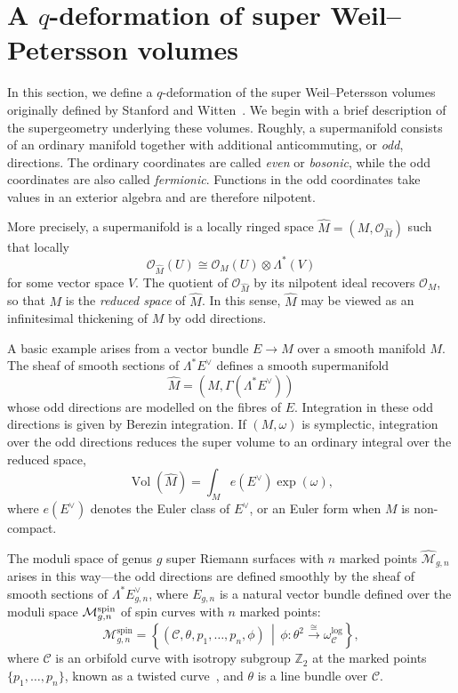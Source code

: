 \documentclass[a4paper]{article}
\theoremstyle{plain}
\theoremstyle{definition}
\newcommand{\modm}{\mathcal{M}}
\newcommand{\bz}{\mathbb{Z}}
\newcommand{\cc}{\mathcal{C}}
\newcommand{\co}{\mathcal{O}}
\begin{document}
\section{A \texorpdfstring{$q$}{q}-deformation of super Weil--Petersson volumes} \label{sec3}
In this section, we define a $q$-deformation of the super Weil--Petersson
volumes originally defined by Stanford and Witten~\cite{SWiJTG}.  We begin
with a brief description of the supergeometry underlying these volumes.
Roughly, a supermanifold consists of an ordinary manifold together with
additional anticommuting, or \emph{odd}, directions.  The ordinary coordinates
are called \emph{even} or \emph{bosonic}, while the odd coordinates are also
called \emph{fermionic}.  Functions in the odd coordinates take values in an
exterior algebra and are therefore nilpotent.

More precisely, a supermanifold is a locally ringed space
$\widehat{M}=(M,\co_{\widehat{M}})$ such that locally
\[
\co_{\widehat{M}}(U)
\cong
\co_M(U)\otimes\Lambda^*(V)
\]
for some vector space $V$.  The quotient of $\co_{\widehat{M}}$ by its
nilpotent ideal recovers $\co_M$, so that $M$ is the \emph{reduced space} of
$\widehat{M}$.  In this sense, $\widehat{M}$ may be viewed as an infinitesimal
thickening of $M$ by odd directions.

A basic example arises from a vector bundle $E\to M$ over a smooth manifold
$M$.  The sheaf of smooth sections of $\Lambda^*E^\vee$ defines a smooth
supermanifold
\[
\widehat{M}=(M,\Gamma(\Lambda^*E^\vee))
\]
whose odd directions are modelled on the fibres of $E$.  Integration in these
odd directions is given by Berezin integration.  If $(M,\omega)$ is
symplectic, integration over the odd directions reduces the super volume to
an ordinary integral over the reduced space,
\[
\operatorname{Vol}(\widehat{M})
=
\int_M e(E^\vee)\exp(\omega),
\]
where $e(E^\vee)$ denotes the Euler class of $E^\vee$, or an
Euler form when $M$ is non-compact.

The moduli space of genus $g$ super Riemann surfaces with $n$ marked points $\widehat{\modm}_{g,n}$ arises in this way---the odd directions are defined smoothly by the sheaf of smooth sections of $\Lambda^*E_{g,n}^\vee$, where $E_{g,n}$ is a natural vector bundle defined over the moduli space $\modm_{g,n}^{\rm spin}$ of spin curves with $n$ marked points:
\[
{\modm}_{g,n}^{\text{spin}} = \left\{ (\cc,\theta,p_1,\ldots, p_n,\phi) \,\middle|\, \phi:\theta^2\stackrel{\cong}{\longrightarrow}\omega_{\cc}^{\text{log}} \right\},
\]
where $\cc$ is an orbifold curve with isotropy subgroup $\bz_2$ at the marked points $\{p_1, \ldots, p_n\}$, known as a twisted curve~\cite{AJaMod}, and $\theta$ is a line bundle over $\cc$.
\end{document}
